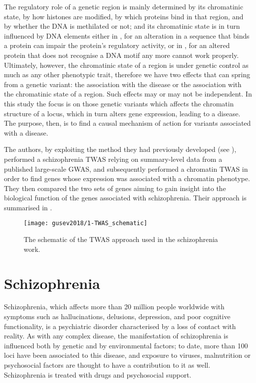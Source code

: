 \documentclass[../main.tex]{subfiles}
\begin{document}
The regulatory role of a genetic region is mainly determined by its 
chromatinic state, \ie by how histones are modified, by which proteins 
bind in that region, and by whether the DNA is methilated or not; and 
its chromatinic state is in turn influenced by DNA elements either in 
\cis, for an alteration in a sequence that binds a protein can impair 
the protein's regulatory activity, or in \trans, for an altered protein 
that does not recognise a DNA motif any more cannot work properly. 
Ultimately, however, the chromatinic state of a region is under genetic 
control as much as any other phenotypic trait, therefore we have two 
effects that can spring from a genetic variant: the association with the 
disease or the association with the chromatinic state of a region. Such 
effects may or may not be independent. In this study the focus is on 
those genetic variants which affects the chromatin structure of a locus, 
which in turn alters gene expression, leading to a disease. The purpose, 
then, is to find a causal mechanism of action for variants associated 
with a disease.

The authors, by exploiting the method they had previously developed (see 
), performed a schizophrenia TWAS relying on 
summary-level data from a published large-scale GWAS, and subsequently 
performed a chromatin TWAS in order to find genes whose expression was 
associated with a chromatin phenotype. They then compared the two sets 
of genes aiming to gain insight into the biological function of the 
genes associated with schizophrenia. Their approach is summarised in 
.

\begin{figure}
	\texttt{[image: gusev2018/1-TWAS\_schematic]}
	\caption{The schematic of the TWAS approach used in the 
schizophrenia work.}
\end{figure}

\section{Schizophrenia}

Schizophrenia, which affects more than 20 million people 
worldwide with symptoms such as hallucinations, delusions, depression, 
and poor cognitive functionality, is a psychiatric disorder 
characterised by a loss of contact with 
reality\cite{https://www.nimh.nih.gov/health/topics/schizophrenia/index.shtml}. 
As with any complex disease, the manifestation of schizophrenia is 
influenced both by genetic and by environmental factors; to date, more 
than 100 loci have been associated to this disease, and exposure to 
viruses, malnutrition or psychosocial factors are thought to have a 
contribution to it as well. Schizophrenia is treated with drugs and 
psychosocial support.
\end{document}
